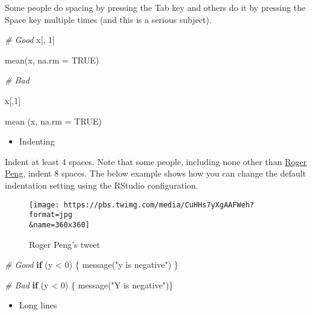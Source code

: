 \documentclass[
]{book}
\newenvironment{Shaded}{\begin{snugshade}}{\end{snugshade}}
\newcommand{\AttributeTok}[1]{\textcolor[rgb]{0.77,0.63,0.00}{#1}}
\newcommand{\CommentTok}[1]{\textcolor[rgb]{0.56,0.35,0.01}{\textit{#1}}}
\newcommand{\ConstantTok}[1]{\textcolor[rgb]{0.00,0.00,0.00}{#1}}
\newcommand{\ControlFlowTok}[1]{\textcolor[rgb]{0.13,0.29,0.53}{\textbf{#1}}}
\newcommand{\DecValTok}[1]{\textcolor[rgb]{0.00,0.00,0.81}{#1}}
\newcommand{\FunctionTok}[1]{\textcolor[rgb]{0.00,0.00,0.00}{#1}}
\newcommand{\NormalTok}[1]{#1}
\newcommand{\SpecialCharTok}[1]{\textcolor[rgb]{0.00,0.00,0.00}{#1}}
\newcommand{\StringTok}[1]{\textcolor[rgb]{0.31,0.60,0.02}{#1}}
\providecommand{\tightlist}{%
  \setlength{\itemsep}{0pt}\setlength{\parskip}{0pt}}
\begin{document}
Some people do spacing by pressing the Tab key and others do it by pressing the Space key multiple times (and this is a serious subject).

\begin{Shaded}
\begin{Highlighting}[]
\CommentTok{\# Good}
\NormalTok{x[, }\DecValTok{1}\NormalTok{] }

\FunctionTok{mean}\NormalTok{(x, }\AttributeTok{na.rm =} \ConstantTok{TRUE}\NormalTok{) }

\CommentTok{\# Bad}

\NormalTok{x[,}\DecValTok{1}\NormalTok{]}

\FunctionTok{mean}\NormalTok{ (x, }\AttributeTok{na.rm =} \ConstantTok{TRUE}\NormalTok{)}
\end{Highlighting}
\end{Shaded}

\begin{itemize}
\tightlist
\item
  Indenting
\end{itemize}

Indent at least 4 spaces. Note that some people, including none other than \href{https://simplystatistics.org/2018/07/27/why-i-indent-my-code-8-spaces/}{Roger Peng}, indent 8 spaces. The below example shows how you can change the default indentation setting using the RStudio configuration.

\begin{figure}
\centering
\texttt{[image: https://pbs.twimg.com/media/CuHHs7yXgAAFWeh?format=jpg\\\&name=360x360]}
\caption{Roger Peng's tweet}
\end{figure}

\begin{Shaded}
\begin{Highlighting}[]
\CommentTok{\# Good}
\ControlFlowTok{if}\NormalTok{ (y }\SpecialCharTok{\textless{}} \DecValTok{0}\NormalTok{) \{}
  \FunctionTok{message}\NormalTok{(}\StringTok{"y is negative"}\NormalTok{)}
\NormalTok{\}}

\CommentTok{\# Bad}
\ControlFlowTok{if}\NormalTok{ (y }\SpecialCharTok{\textless{}} \DecValTok{0}\NormalTok{) \{}
\FunctionTok{message}\NormalTok{(}\StringTok{"Y is negative"}\NormalTok{)\}}
\end{Highlighting}
\end{Shaded}

\begin{itemize}
\tightlist
\item
  Long lines
\end{itemize}
\end{document}
